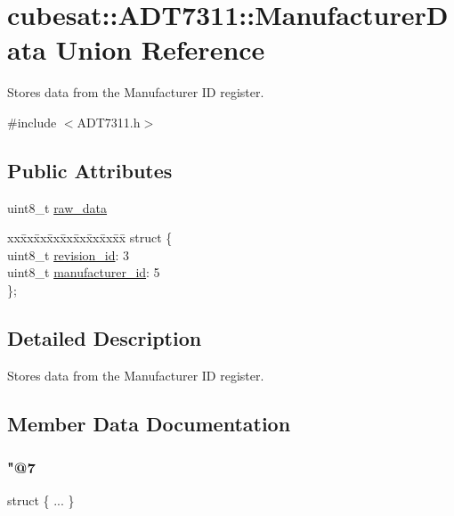\hypertarget{unioncubesat_1_1ADT7311_1_1ManufacturerData}{}\section{cubesat\+:\+:A\+D\+T7311\+:\+:Manufacturer\+Data Union Reference}
\label{unioncubesat_1_1ADT7311_1_1ManufacturerData}


Stores data from the Manufacturer ID register.  




{\ttfamily \#include $<$A\+D\+T7311.\+h$>$}

\subsection*{Public Attributes}
\begin{DoxyCompactItemize}
\item 
uint8\+\_\+t \hyperlink{unioncubesat_1_1ADT7311_1_1ManufacturerData_a020fb0b501cad0bf19424a65654fde11}{raw\+\_\+data}
\item 
\begin{tabbing}
xx\=xx\=xx\=xx\=xx\=xx\=xx\=xx\=xx\=\kill
struct \{\\
\>uint8\_t \hyperlink{unioncubesat_1_1ADT7311_1_1ManufacturerData_a7558c7378e095c03e018e0d2c23d6b16}{revision\_id}: 3\\
\>uint8\_t \hyperlink{unioncubesat_1_1ADT7311_1_1ManufacturerData_a3c8ac9331622f2950347f8a271f55090}{manufacturer\_id}: 5\\
\}; \\

\end{tabbing}\end{DoxyCompactItemize}


\subsection{Detailed Description}
Stores data from the Manufacturer ID register. 

\subsection{Member Data Documentation}
\mbox{\label{unioncubesat_1_1ADT7311_1_1ManufacturerData_a96d2d46f618cbad947f2286568fa4a7d}} 
\subsubsection{\texorpdfstring{"@7}{@7}}
{\footnotesize\ttfamily struct \{ ... \} }

